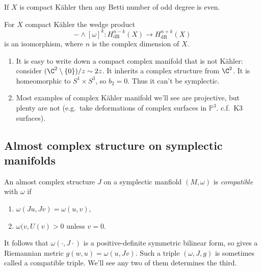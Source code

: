 \documentclass[a4paper]{article}
\renewcommand*{\P}{\mathbb{P}}
\newcommand{\w}{\wedge} %
\begin{document}
\begin{corollary}
  If \(X\) is compact Kähler then any Betti number of odd degree is even.
\end{corollary}

\begin{theorem}[Lefschetz]
  For \(X\) compact Kähler the wedge product
  \[
    - \w [\omega]^k: H^{n - k}_{\mathrm{dR}}(X) \to H^{n + k}_{\mathrm{dR}}(X)
  \]
  is an isomorphism, where \(n\) is the complex dimension of \(X\).
\end{theorem}

\begin{remark}\leavevmode
  \begin{enumerate}
  \item It is easy to write down a compact complex manifold that is not Kähler: consider \((\C^2 \setminus \{0\})/z \sim 2z\). It inherits a complex structure from \(\C^2\). It is homeomorphic to \(S^1 \times S^3\), so \(b_2 = 0\). Thus it can't be symplectic.
  \item Most examples of complex Kähler manifold we'll see are projective, but plenty are not (e.g.\ take deformations of complex surfaces in \(\P^3\). c.f.\ K3 surfaces).
  \end{enumerate}
\end{remark}

\subsection{Almost complex structure on symplectic manifolds}

\begin{definition}
  An almost complex structure \(J\) on a symplectic manfiold \((M, \omega)\) is \emph{compatible} with \(\omega\) if
  \begin{enumerate}
  \item \(\omega(Ju, Jv) = \omega(u, v)\),
  \item \(\omega(v, U(v) > 0\) unless \(v = 0\).
  \end{enumerate}
\end{definition}

\begin{note}
  It follows that \(\omega(\cdot, J \cdot)\) is a positive-definite symmetric bilinear form, so gives a Riemannian metric \(g(w, u) = \omega(u, Jv)\). Such a triple \((\omega, J, g)\) is sometimes called a compatible triple. We'll see any two of them determines the third.
\end{note}
\end{document}

